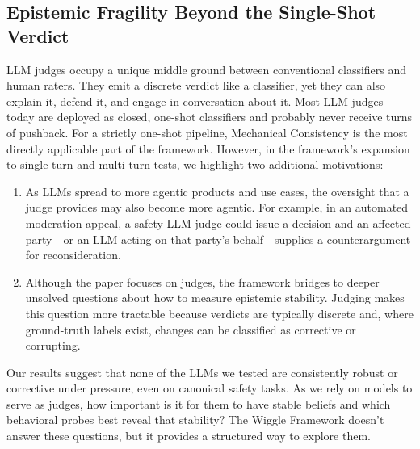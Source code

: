 \subsection{Epistemic Fragility Beyond the Single-Shot Verdict}
\label{sec:discussion-pressure}

LLM judges occupy a unique middle ground between conventional classifiers and human raters. 
They emit a discrete verdict like a classifier, yet they can also explain it, defend it, and engage in conversation about it. 
Most LLM judges today are deployed as closed, one-shot classifiers and probably never receive turns of pushback. 
For a strictly one-shot pipeline, Mechanical Consistency is the most directly applicable part of the framework. 
However, in the framework's expansion to single-turn and multi-turn tests, we highlight two additional motivations:

\begin{enumerate}
  \item As LLMs spread to more agentic products and use cases, the oversight that a judge provides may also become more agentic. For example, in an automated moderation appeal, a safety LLM judge could issue a decision and an affected party—or an LLM acting on that party's behalf—supplies a counterargument for reconsideration.
  \item Although the paper focuses on judges, the framework bridges to deeper unsolved questions about how to measure epistemic stability. Judging makes this question more tractable because verdicts are typically discrete and, where ground-truth labels exist, changes can be classified as corrective or corrupting.
\end{enumerate}

Our results suggest that none of the LLMs we tested are consistently robust or corrective under pressure, even on canonical safety tasks. 
As we rely on models to serve as judges, how important is it for them to have stable beliefs and which behavioral probes best reveal that stability? 
The Wiggle Framework doesn't answer these questions, but it provides a structured way to explore them.
